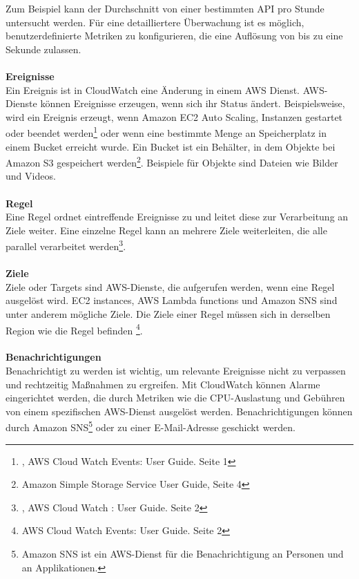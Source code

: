 Zum Beispiel kann der Durchschnitt von einer bestimmten API pro Stunde untersucht werden. Für eine detailliertere Überwachung ist es möglich, benutzerdefinierte Metriken zu konfigurieren, die eine Auflösung von bis zu eine Sekunde zulassen. %
\\\\
\textbf{Ereignisse}\\
Ein Ereignis ist in CloudWatch eine Änderung in einem AWS Dienst. AWS-Dienste können Ereignisse erzeugen, wenn sich ihr Status ändert. %
Beispielsweise, wird ein Ereignis erzeugt, wenn Amazon EC2 Auto Scaling, Instanzen gestartet oder beendet werden\footnote{\cite{AMZ13}, AWS Cloud Watch Events: User Guide. Seite 1} oder wenn eine bestimmte Menge an Speicherplatz in einem Bucket erreicht wurde. Ein Bucket ist ein Behälter, in dem Objekte bei Amazon S3 gespeichert werden\footnote{\cite{AMZ18}Amazon Simple Storage Service User Guide, Seite 4}. Beispiele für Objekte sind Dateien wie Bilder und Videos. 
\\\\
\textbf{Regel} \\
Eine Regel ordnet eintreffende Ereignisse zu und leitet diese zur Verarbeitung an Ziele weiter.
Eine einzelne Regel kann an mehrere Ziele weiterleiten, die alle parallel verarbeitet werden\footnote{\cite{AMZ13}, AWS Cloud Watch : User Guide. Seite 2}.
\\\\
\textbf{Ziele} \\
Ziele oder Targets sind AWS-Dienste, die aufgerufen werden, wenn eine Regel ausgelöst wird.
EC2 instances, AWS Lambda functions und Amazon SNS sind unter anderem mögliche Ziele.
Die Ziele einer Regel müssen sich in derselben Region wie die Regel befinden
\footnote{\cite{AMZ13}AWS Cloud Watch Events: User Guide. Seite 2}.
\\\\
\textbf{Benachrichtigungen}\\
Benachrichtigt zu werden ist wichtig, um relevante Ereignisse nicht zu verpassen und rechtzeitig Maßnahmen zu ergreifen. Mit CloudWatch können Alarme eingerichtet werden, die durch Metriken wie die CPU-Auslastung und Gebühren von einem spezifischen AWS-Dienst ausgelöst werden. Benachrichtigungen können durch Amazon SNS\footnote{\cite{AMZ30}Amazon SNS ist ein AWS-Dienst für die Benachrichtigung an Personen und an Applikationen.} oder zu einer E-Mail-Adresse geschickt werden.
